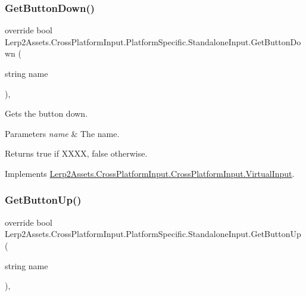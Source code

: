 \subsubsection{\texorpdfstring{Get\+Button\+Down()}{GetButtonDown()}}
{\footnotesize\ttfamily override bool Lerp2\+Assets.\+Cross\+Platform\+Input.\+Platform\+Specific.\+Standalone\+Input.\+Get\+Button\+Down (\begin{DoxyParamCaption}\item[{string}]{name }\end{DoxyParamCaption})\hspace{0.3cm}{\ttfamily [inline]}, {\ttfamily [virtual]}}



Gets the button down. 


\begin{DoxyParams}{Parameters}
{\em name} & The name.\\
\hline
\end{DoxyParams}
\begin{DoxyReturn}{Returns}
{\ttfamily true} if X\+X\+XX, {\ttfamily false} otherwise.
\end{DoxyReturn}


Implements \hyperlink{class_lerp2_assets_1_1_cross_platform_input_1_1_cross_platform_input_1_1_virtual_input_a0e032fff9d6abc32017cee10d69d32d4}{Lerp2\+Assets.\+Cross\+Platform\+Input.\+Cross\+Platform\+Input.\+Virtual\+Input}.

\mbox{\label{class_lerp2_assets_1_1_cross_platform_input_1_1_platform_specific_1_1_standalone_input_ace14ca6435635fc1d2ddaf1731f8410c}} 
\subsubsection{\texorpdfstring{Get\+Button\+Up()}{GetButtonUp()}}
{\footnotesize\ttfamily override bool Lerp2\+Assets.\+Cross\+Platform\+Input.\+Platform\+Specific.\+Standalone\+Input.\+Get\+Button\+Up (\begin{DoxyParamCaption}\item[{string}]{name }\end{DoxyParamCaption})\hspace{0.3cm}{\ttfamily [inline]}, {\ttfamily [virtual]}}



